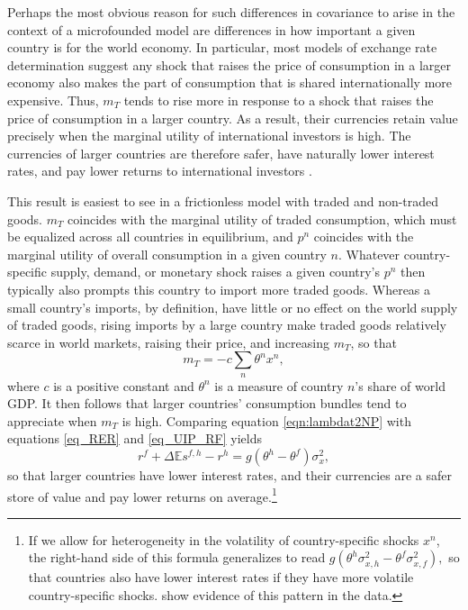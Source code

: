 \documentclass{ar-1col}
\begin{document}
Perhaps the most obvious reason for such differences in covariance to arise in the context of a microfounded model are differences in how important a given country is for the world economy. In particular, most models of exchange rate determination suggest any shock that raises the price of consumption in a larger economy also makes the part of consumption that is shared internationally more expensive. Thus, $m_T$ tends to rise more in response to a shock that raises the price of consumption in a larger country. As a result, their currencies retain value precisely when the marginal utility of international investors is high. The currencies of larger countries are therefore safer, have naturally lower interest rates, and pay lower returns to international investors \citep{Martin2012, Hassan2013}.

This result is easiest to see in a frictionless model with traded and non-traded goods. $m_T$ coincides with the marginal utility of traded consumption, which must be equalized across all countries in equilibrium, and $p^n$ coincides with the marginal utility of overall consumption in a given country $n$. Whatever country-specific supply, demand, or monetary shock raises a given country's $p^n$ then typically also prompts this country to import more traded goods. Whereas a small country's imports, by definition, have little or no effect on the world supply of traded goods, rising imports by a large country make traded goods relatively scarce in world markets, raising their price, and increasing $m_T$, so that
\begin{equation} 
    m_{T} = -c \sum_{n} \theta^n x^n,
    \label{eqn:lambdat2NP}
\end{equation}
where $c$ is a positive constant and $\theta^n$ is a measure of country $n$'s share of world GDP. It then follows that larger countries' consumption bundles tend to appreciate when $m_T$ is high. Comparing equation \ref{eqn:lambdat2NP} with equations \ref{eq_RER} and \ref{eq_UIP_RF} yields
\begin{equation}
  r^{f} + \Delta \mathbb{E} s^{f, h} - r^{h}
  =g\left(\theta^h - \theta^f\right) \sigma_x^2,
  \label{eq_FF_UIP}
\end{equation}
so that larger countries have lower interest rates, and their currencies are a safer store of value and pay lower returns on average.\footnote{If we allow for heterogeneity in the volatility of country-specific shocks $x^n$, the right-hand side of this formula generalizes to read $g(\theta^h
\sigma_{x,h}^2-\theta^f
\sigma_{x,f}^2),$ so that countries also have lower interest rates if they have more volatile country-specific shocks. \cite{to2019nontraded} show evidence of this pattern in the data.  }
  
\end{document}
